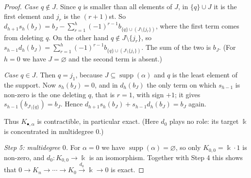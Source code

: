 \begin{proof}
\emph{Case $q\notin J$.}
Since $q$ is smaller than all elements of $J$, in $\{q\}\cup J$ it is the first element and $j_r$ is the $(r+1)$st.
So $d_{h+1}s_h(b_J)=b_J-\sum_{r=1}^h(-1)^{r-1}b_{\{q\}\cup(J\setminus\{j_r\})}$, where the first term comes from deleting $q$.
On the other hand $q\notin J\setminus\{j_r\}$, so $s_{h-1}d_h(b_J)=\sum_{r=1}^h(-1)^{r-1}b_{\{q\}\cup(J\setminus\{j_r\})}$.
The sum of the two is $b_J$.
(For $h=0$ we have $J=\varnothing$ and the second term is absent.)

\emph{Case $q\in J$.}
Then $q=j_1$, because $J\subseteq\operatorname{supp}(\alpha)$ and $q$ is the least element of the support.
Now $s_h(b_J)=0$, and in $d_h(b_J)$ the only term on which $s_{h-1}$ is non-zero is the one deleting $q$, that is $r=1$, with sign $+1$; it gives $s_{h-1}(b_{J\setminus\{q\}})=b_J$.
Hence $d_{h+1}s_h(b_J)+s_{h-1}d_h(b_J)=b_J$ again.

Thus $K_{\bullet,\alpha}$ is contractible, in particular exact.
(Here $d_0$ plays no role: its target $\Bbbk$ is concentrated in multidegree $0$.)

\emph{Step 5: multidegree $0$.}
For $\alpha=0$ we have $\operatorname{supp}(\alpha)=\varnothing$, so only $K_{0,0}=\Bbbk\cdot1$ is non-zero, and $d_0:K_{0,0}\to\Bbbk$ is an isomorphism.
Together with Step 4 this shows that $0\to K_n\to\cdots\to K_0\xrightarrow{d_0}\Bbbk\to0$ is exact.
\end{proof}

